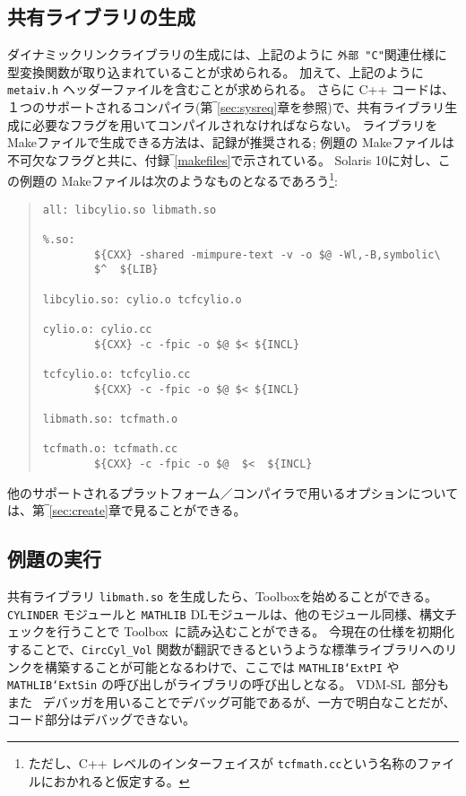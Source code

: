 \documentclass[\pformat,12pt]{jarticle}
\newcommand{\vdmslpp}{VDM-SL}
\newcommand{\Toolbox}{Toolbox}
\begin{document}
\subsection*{共有ライブラリの生成}

ダイナミックリンクライブラリの生成には、上記のように {\tt 外部 "C"}関連仕様に型変換関数が取り込まれていることが求められる。
加えて、上記のように{\tt metaiv.h} ヘッダーファイルを含むことが求められる。
さらに C++ コードは、１つのサポートされるコンパイラ(第‾\ref{sec:sysreq}章を参照)で、共有ライブラリ生成に必要なフラグを用いてコンパイルされなければならない。 
ライブラリを Makeファイルで生成できる方法は、記録が推奨される; 例題の Makeファイルは不可欠なフラグと共に、付録‾\ref{makefiles}で示されている。
Solaris 10に対し、この例題の Makeファイルは次のようなものとなるであろう\footnote{ただし、C++ レベルのインターフェイスが {\tt tcfmath.cc}という名称のファイルにおかれると仮定する。}:

\begin{quote}
\begin{verbatim}
all: libcylio.so libmath.so

%.so:
        ${CXX} -shared -mimpure-text -v -o $@ -Wl,-B,symbolic\
        $^  ${LIB}

libcylio.so: cylio.o tcfcylio.o 

cylio.o: cylio.cc
        ${CXX} -c -fpic -o $@ $< ${INCL}

tcfcylio.o: tcfcylio.cc
        ${CXX} -c -fpic -o $@ $< ${INCL}

libmath.so: tcfmath.o

tcfmath.o: tcfmath.cc
        ${CXX} -c -fpic -o $@  $<  ${INCL}
\end{verbatim}
\end{quote}

他のサポートされるプラットフォーム／コンパイラで用いるオプションについては、第‾\ref{sec:create}章で見ることができる。

\subsection*{例題の実行}

共有ライブラリ {\tt libmath.so} を生成したら、Toolboxを始めることができる。
{\tt CYLINDER} モジュールと {\tt MATHLIB} DLモジュールは、他のモジュール同様、構文チェックを行うことで \Toolbox\ に読み込むことができる。 
今現在の仕様を初期化することで、{\tt CircCyl\_Vol} 関数が翻訳できるというような標準ライブラリへのリンクを構築することが可能となるわけで、ここでは {\tt MATHLIB`ExtPI} や{\tt MATHLIB`ExtSin} の呼び出しがライブラリの呼び出しとなる。 \vdmslpp\ 部分もまた \VDMTools\ デバッガを用いることでデバッグ可能であるが、一方で明白なことだが、コード部分はデバッグできない。
\end{document}
